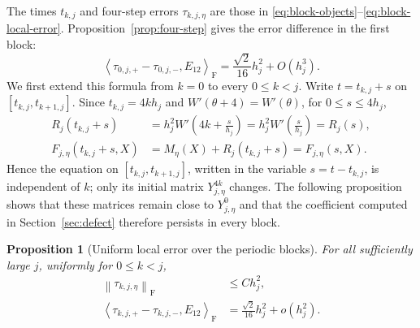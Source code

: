 \documentclass[]{article}
\numberwithin{equation}{section}
\theoremstyle{plain}
\newtheorem{proposition}[theorem]{Proposition}
\theoremstyle{remark}
\newcommand{\F}{\mathrm F}
\newcommand{\norm}[1]{\left\lVert #1\right\rVert}
\newcommand{\ip}[2]{\left\langle #1,#2\right\rangle_{\F}}
\begin{document}
The times $t_{k,j}$ and four-step errors $\tau_{k,j,\eta}$ are those in
\eqref{eq:block-objects}--\eqref{eq:block-local-error}.
Proposition~\ref{prop:four-step} gives the error difference in the
first block:
\begin{equation}\label{eq:first-block-coefficient-section-five}
 \ip{\tau_{0,j,+}-\tau_{0,j,-}}{E_{12}}
 =\frac{\sqrt2}{16}h_j^2+O(h_j^3).
\end{equation}
We first extend this formula from $k=0$ to every $0\le k<j$.  Write
$t=t_{k,j}+s$ on $[t_{k,j},t_{k+1,j}]$.  Since
$t_{k,j}=4kh_j$ and $W'(\theta+4)=W'(\theta)$, for
$0\le s\le4h_j$,
\begin{equation}\label{eq:block-periodicity}
\begin{aligned}
 R_j(t_{k,j}+s)&=h_j^2W'\left(4k+\frac{s}{h_j}\right)
 =h_j^2W'\left(\frac{s}{h_j}\right)=R_j(s),\\
 F_{j,\eta}(t_{k,j}+s,X)
 &=M_\eta(X)+R_j(t_{k,j}+s)=F_{j,\eta}(s,X).
\end{aligned}
\end{equation}
Hence the equation on $[t_{k,j},t_{k+1,j}]$, written in the variable
$s=t-t_{k,j}$, is independent of $k$; only its initial matrix
$Y_{j,\eta}^{4k}$ changes.  The following proposition shows that these
matrices remain close to $Y^0_{j,\eta}$ and that the
coefficient computed in Section~\ref{sec:defect} therefore persists in
every block.

\begin{proposition}[Uniform local error over the periodic blocks]
\label{prop:uniform-block}
For all sufficiently large $j$, uniformly for $0\le k<j$,
\begin{align}
 \norm{\tau_{k,j,\eta}}_{\F}&\le Ch_j^2,
 \label{eq:block-bound}\\
 \ip{\tau_{k,j,+}-\tau_{k,j,-}}{E_{12}}
 &=\frac{\sqrt2}{16}h_j^2+o(h_j^2).
 \label{eq:block-centered}
\end{align}
\end{proposition}
\end{document}
